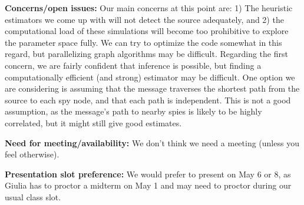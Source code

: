 \documentclass[11pt, onecolumn]{article}
\begin{document}
\vspace{0.1in}
\textbf{Concerns/open issues:}
Our main concerns at this point are: 1) The heuristic estimators we come up with will not detect the source adequately, and 2) the computational load of these simulations will become too prohibitive to explore the parameter space fully. We can try to optimize the code somewhat in this regard, but parallelizing graph algorithms may be difficult. 
Regarding the first concern, we are fairly confident that inference is possible, but finding a computationally efficient (and strong) estimator may be difficult. One option we are considering is assuming that the message traverses the shortest path from the source to each spy node, and that each path is independent. This is not a good assumption, as the message's path to nearby spies is likely to be highly correlated, but it might still give good estimates.

\vspace{0.1in}
\textbf{Need for meeting/availability:} We don’t think we need a meeting (unless you feel otherwise).

\vspace{0.1in}
\textbf{Presentation slot preference:} We would prefer to present on May 6 or 8, as Giulia has to proctor a midterm on May 1 and may need to proctor during our usual class slot.
%
%
\end{document}
